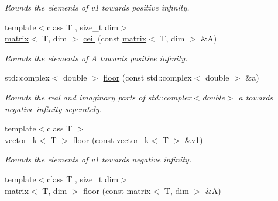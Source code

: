 \begin{DoxyCompactItemize}
\begin{DoxyCompactList}\small\item\em Rounds the elements of v1 towards positive infinity. \end{DoxyCompactList}\item 
\hypertarget{namespacekeycpp_a6f75eb747c57c3e5ff91323f65a02b5f}{{\footnotesize template$<$class T , size\-\_\-t dim$>$ }\\\hyperlink{classkeycpp_1_1matrix}{matrix}$<$ T, dim $>$ \hyperlink{namespacekeycpp_a6f75eb747c57c3e5ff91323f65a02b5f}{ceil} (const \hyperlink{classkeycpp_1_1matrix}{matrix}$<$ T, dim $>$ \&A)}\label{namespacekeycpp_a6f75eb747c57c3e5ff91323f65a02b5f}

\begin{DoxyCompactList}\small\item\em Rounds the elements of A towards positive infinity. \end{DoxyCompactList}\item 
\hypertarget{namespacekeycpp_ab30437496fbd2011521b31aee7961516}{std\-::complex$<$ double $>$ \hyperlink{namespacekeycpp_ab30437496fbd2011521b31aee7961516}{floor} (const std\-::complex$<$ double $>$ \&a)}\label{namespacekeycpp_ab30437496fbd2011521b31aee7961516}

\begin{DoxyCompactList}\small\item\em Rounds the real and imaginary parts of std\-::complex$<$double$>$ a towards negative infinity seperately. \end{DoxyCompactList}\item 
\hypertarget{namespacekeycpp_ac2f984ff29cefe4dc924cb6d69e53786}{{\footnotesize template$<$class T $>$ }\\\hyperlink{classkeycpp_1_1vector__k}{vector\-\_\-k}$<$ T $>$ \hyperlink{namespacekeycpp_ac2f984ff29cefe4dc924cb6d69e53786}{floor} (const \hyperlink{classkeycpp_1_1vector__k}{vector\-\_\-k}$<$ T $>$ \&v1)}\label{namespacekeycpp_ac2f984ff29cefe4dc924cb6d69e53786}

\begin{DoxyCompactList}\small\item\em Rounds the elements of v1 towards negative infinity. \end{DoxyCompactList}\item 
\hypertarget{namespacekeycpp_a8aad0f0ac8036ee114a14da17aefcb5f}{{\footnotesize template$<$class T , size\-\_\-t dim$>$ }\\\hyperlink{classkeycpp_1_1matrix}{matrix}$<$ T, dim $>$ \hyperlink{namespacekeycpp_a8aad0f0ac8036ee114a14da17aefcb5f}{floor} (const \hyperlink{classkeycpp_1_1matrix}{matrix}$<$ T, dim $>$ \&A)}\label{namespacekeycpp_a8aad0f0ac8036ee114a14da17aefcb5f}


\end{DoxyCompactItemize}
